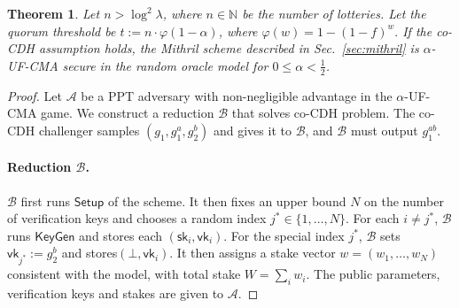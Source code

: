 \documentclass{article}
\newtheorem{theorem}{Theorem}[section]
\newcommand{\sk}[0]{\mathsf{sk}}
\newcommand{\vk}[0]{\mathsf{vk}}
\begin{document}
\begin{theorem}
Let $n>\log^2\lambda$, where $n\in\mathbb{N}$ be the number of lotteries. Let the quorum threshold be $t :=  n\cdot \varphi(1-\alpha)$, where $\varphi(w) = 1-(1-f)^w.$  If the co-CDH assumption holds, the Mithril scheme described in Sec.~\ref{sec:mithril} is $\alpha$-\textsf{UF-CMA} secure in the random oracle model for $0\leq\alpha<\frac{1}{2}$. 
\end{theorem}


\begin{proof}
Let $\mathcal{A}$ be a PPT adversary with non-negligible advantage in the $\alpha$-\textsf{UF-CMA} game. We construct a reduction $\mathcal{B}$ that solves co-CDH problem. The co-CDH challenger samples $(g_1,g_1^a,g_2^b)$ and gives it to $\mathcal{B}$, and $\mathcal{B}$ must output $g_1^{ab}$.

\paragraph{Reduction $\mathcal{B}$.}
$\mathcal{B}$ first runs $\mathsf{Setup}$ of the scheme. It then fixes an upper bound $N$ on the number of verification keys and chooses a random index $j^\ast \in \{1,\dots,N\}$. For each $i \neq j^\ast$, $\mathcal{B}$ runs $\mathsf{KeyGen}$ and stores each $(\sk_i,\vk_i)$. For the special index $j^\ast$, $\mathcal{B}$ sets $\mathsf{vk}_{j^\ast} := g_2^b$ and stores$(\bot,\vk_i)$. It then assigns a stake vector $w = (w_1,\dots,w_N)$ consistent with the model, with total stake $W = \sum_i w_i$. The public parameters, verification keys and stakes are given to $\mathcal{A}$.







\end{proof}
\end{document}
